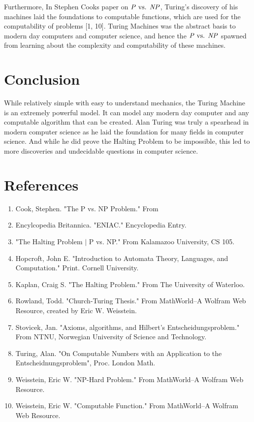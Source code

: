 \documentclass[12pt]{article}
\begin{document}
Furthermore, In Stephen Cooks paper on $\text{\textit{P} vs. \textit{NP}}$, Turing's discovery of his machines laid the foundations to computable functions, which are used for the computability of problems [1, 10]. Turing Machines was the abstract basis to modern day computers and computer science, and hence the $\text{\textit{P} vs. \textit{NP}}$ spawned from learning about the complexity and computability of these machines.

\section{Conclusion}

While relatively simple with easy to understand mechanics, the Turing Machine is an extremely powerful model. It can model any modern day computer and any computable algorithm that can be created. Alan Turing was truly a spearhead in modern computer science as he laid the foundation for many fields in computer science. And while he did prove the Halting Problem to be impossible, this led to more discoveries and undecidable questions in computer science.


\section*{References}
\begin{enumerate}
\item Cook, Stephen. "The P vs. NP Problem." From 
\item Encylcopedia Britannica. "ENIAC." Encyclopedia Entry.
\item "The Halting Problem $\mid$ P vs. NP." From Kalamazoo University, CS 105.
\item Hopcroft, John E. "Introduction to Automata Theory, Languages, and Computation." Print. Cornell University.
\item Kaplan, Craig S. "The Halting Problem." From The University of Waterloo.
\item Rowland, Todd. "Church-Turing Thesis." From MathWorld--A Wolfram Web Resource, created by Eric W. Weisstein.
\item Stovicek, Jan. "Axioms, algorithms, and Hilbert's Entscheidungsproblem." From NTNU, Norwegian University of Science and Technology.
\item Turing, Alan. "On Computable Numbers with an Application to the Entscheidnungsproblem", Proc. London Math.
\item Weisstein, Eric W. "NP-Hard Problem." From MathWorld--A Wolfram Web Resource.
\item Weisstein, Eric W. "Computable Function." From MathWorld--A Wolfram Web Resource.


\end{enumerate}
\end{document}
